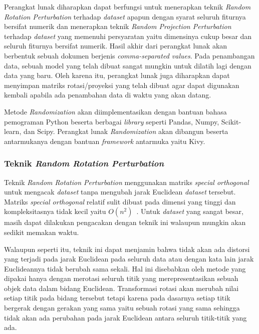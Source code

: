 Perangkat lunak diharapkan dapat berfungsi untuk menerapkan teknik \textit{Random Rotation Perturbation} terhadap \textit{dataset} apapun dengan syarat seluruh fiturnya bersifat numerik dan menerapkan teknik \textit{Random Projection Perturbation} terhadap \textit{dataset} yang memenuhi persyaratan yaitu dimensinya cukup besar dan seluruh fiturnya bersifat numerik. Hasil akhir dari perangkat lunak akan berbentuk sebuah dokumen berjenis \textit{comma-separated values}. Pada penambangan data, sebuah model yang telah dibuat sangat mungkin untuk dilatih lagi dengan data yang baru. Oleh karena itu, perangkat lunak juga diharapkan dapat menyimpan matriks rotasi/proyeksi yang telah dibuat agar dapat digunakan kembali apabila ada penambahan data di waktu yang akan datang.

Metode \textit{Randomization} akan diimplementasikan dengan bantuan bahasa pemograman Python beserta berbagai \textit{library} seperti Pandas, Numpy, Scikit-learn, dan Scipy. Perangkat lunak \textit{Randomization} akan dibangun beserta antarmukanya dengan bantuan \textit{framework} antarmuka yaitu Kivy.

\subsubsection{Teknik \textit{Random Rotation Perturbation}}
\label{subsubsec:analisis-rrp}

Teknik \textit{Random Rotation Perturbation} menggunakan matriks \textit{special orthogonal} untuk mengacak \textit{dataset} tanpa mengubah jarak Euclidean \textit{dataset} tersebut. Matriks \textit{special orthogonal} relatif sulit dibuat pada dimensi yang tinggi dan kompleksitasnya tidak kecil yaitu \(O(n^2)\)~\cite{stewart:80:orthogonal}. Untuk \textit{dataset} yang sangat besar, masih dapat dilakukan pengacakan dengan teknik ini walaupun mungkin akan sedikit memakan waktu.

Walaupun seperti itu, teknik ini dapat menjamin bahwa tidak akan ada distorsi yang terjadi pada jarak Euclidean pada seluruh data atau dengan kata lain jarak Euclideannya tidak berubah sama sekali. Hal ini disebabkan oleh metode yang dipakai hanya dengan merotasi seluruh titik yang merepresentasikan sebuah objek data dalam bidang Euclidean. Transformasi rotasi akan merubah nilai setiap titik pada bidang tersebut tetapi karena pada dasarnya setiap titik bergerak dengan gerakan yang sama yaitu sebuah rotasi yang sama sehingga tidak akan ada perubahan pada jarak Euclidean antara seluruh titik-titik yang ada.

